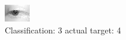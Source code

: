 \begin{figure}[h!]
\begin{center}
\includegraphics[width=0.60\columnwidth]{figures/ID2708_class_3_target_4.png}
\end{center}
\caption{ Classification: 3 actual target: 4}
\label{fig:ID2708_class_3_target_4}
\end{figure}
